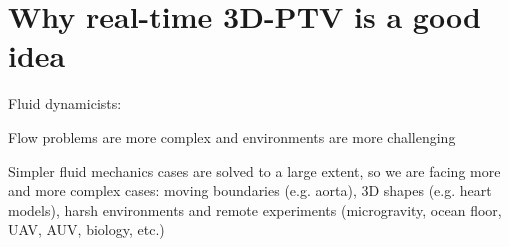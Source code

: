 
\section{Why real-time 3D-PTV is a good idea}

\begin{frame}[label=why-1]{Fluid dynamicists: }
    \centering{}
\end{frame}


\begin{frame}[label=why-3]{Flow problems are more complex and environments are more challenging}
\begin{card}
    Simpler fluid mechanics cases are solved to a large extent, so we are facing more and more complex cases: 
    moving boundaries (e.g. aorta), 3D shapes (e.g. heart models), harsh environments and remote experiments (microgravity, ocean floor, UAV, AUV, biology, etc.)
\end{card}
\end{frame}

